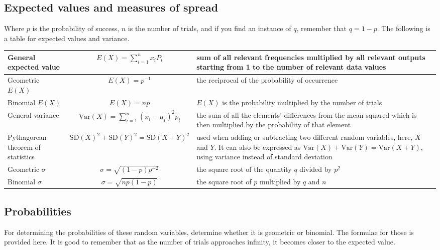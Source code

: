 \documentclass{article}
\begin{document}
\subsection{Expected values and measures of spread}
Where $p$ is the probability of success, $n$ is the number of trials, and if you find an instance of $q$, remember that $q = 1-p$. The following is a table for expected values and variance.
\begin{center}
\begin{tabular}{ >{\centering\arraybackslash}m{4cm} c m{6cm} } \hline
General expected value & $E\left(X\right) = \sum^{n}_{i=1} x_i P_i$ & sum of all relevant frequencies multiplied by all relevant outputs starting from 1 to the number of relevant data values \\ \hline
Geometric $E(X)$ & $E(X) = p^{-1}$ & the reciprocal of the probability of occurrence \\ \hline
Binomial $E(X)$ & $E(X) = np$ & $E(X)$ is the probability multiplied by the number of trials \\ \hline
General variance & $\mathrm{Var}\left(X\right) = \sum^{n}_{i=1}\left(x_i - \mu_i \right)^2 p_i$ & the sum of all the elements' differences from the mean squared which is then multiplied by the probability of that element \\ \hline
Pythagorean theorem of statistics & $\mathrm{SD}(X)^2 + \mathrm{SD}(Y)^2 = \mathrm{SD}(X+Y)^2$ & used when adding or subtracting two different random variables, here, $X$ and $Y$. It can also be expressed as $\mathrm{Var}(X) + \mathrm{Var}(Y) = \mathrm{Var}(X+Y)$, using variance instead of standard deviation \\ \hline
Geometric $\sigma$ & $\sigma = \sqrt{\left(1-p\right)p^{-2}}$ & the square root of the quantity $q$ divided by $p^2$ \\ \hline
Binomial $\sigma$ & $\sigma = \sqrt{np\left(1-p\right)}$ & the square root of $p$ multiplied by $q$ and $n$ \\ \hline
\end{tabular}
\end{center}

\subsection{Probabilities}
For determining the probabilities of these random variables, determine whether it is geometric or binomial. The formulae for those is provided here. It is good to remember that as the number of trials approaches infinity, it becomes closer to the expected value.
\end{document}
